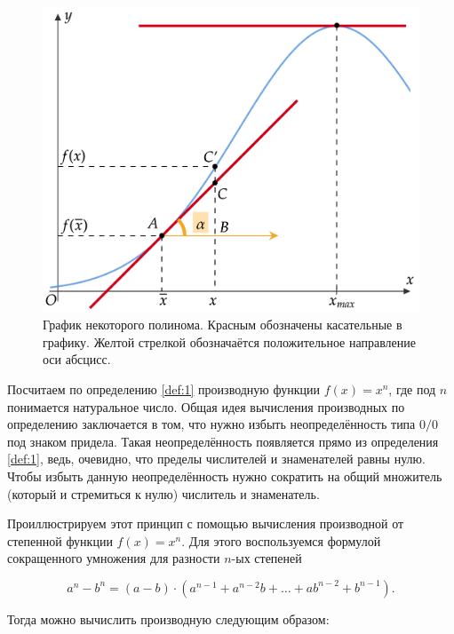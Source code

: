 \documentclass[12pt]{article}
\begin{document}
\begin{figure}[htbp]
	\centering
	\includegraphics[width=1\linewidth]{fig3}
	\caption{График некоторого полинома. Красным обозначены касательные в графику. Желтой стрелкой обозначаётся положительное направление оси абсцисс.}
	\label{fig:fig1}
\end{figure}

\par Посчитаем по определению \ref{def:1} производную функции $f(x) = x^n$, где под $n$ понимается натуральное число. Общая идея вычисления производных по определению заключается в том, что нужно избыть неопределённость типа $0/0$ под знаком придела. Такая неопределённость появляется прямо из определения \ref{def:1}, ведь, очевидно, что пределы числителей и знаменателей равны нулю. Чтобы избыть данную неопределённость нужно сократить на общий множитель (который и стремиться к нулю) числитель и знаменатель.

\par Проиллюстрируем этот принцип с помощью вычисления производной от степенной функции $f(x) = x^n$. Для этого воспользуемся формулой сокращенного умножения \cite{sok_um} для разности $n$\--ых степеней

\begin{equation}
	a^n - b^n = (a-b)\cdot(a^{n-1} + a^{n-2}b + \ldots + ab^{n-2} + b^{n-1}).
\end{equation}

Тогда можно вычислить производную следующим образом:
\end{document}
